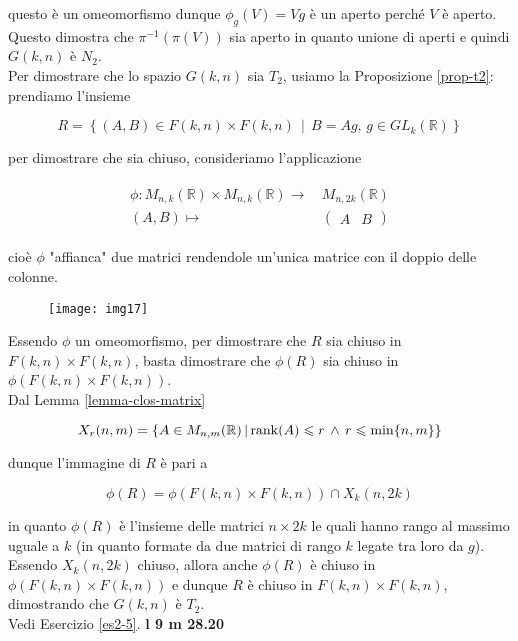questo è un omeomorfismo dunque $ \phi_{g}(V) = V g $ è un aperto perché $ V $ è aperto. Questo dimostra che $ \pi^{-1}(\pi(V)) $ sia aperto in quanto unione di aperti e quindi $ G(k,n) $ è $ N_{2} $.\\
Per dimostrare che lo spazio $ G(k,n) $ sia $ T_{2} $, usiamo la Proposizione \ref{prop-t2}: prendiamo l'insieme

\begin{equation}
	R = \left\{ (A,B) \in F(k,n) \times F(k,n) \, \middle| \, B = A g, \, g \in GL_{k}(\mathbb{R}) \right\}
\end{equation}

per dimostrare che sia chiuso, consideriamo l'applicazione

\begin{align}
	\begin{split}
		\phi : M_{n,k}(\mathbb{R}) \times M_{n,k}(\mathbb{R}) \to& \, M_{n,2k}(\mathbb{R})\\
		(A,B) \mapsto& \, \begin{pmatrix} A & B \end{pmatrix}
	\end{split}
\end{align}

cioè $ \phi $ "affianca" due matrici rendendole un'unica matrice con il doppio delle colonne.

\begin{figure}[H]
	\centering
	\texttt{[image: img17]}
\end{figure}

Essendo $ \phi $ un omeomorfismo, per dimostrare che $ R $ sia chiuso in $ F(k,n) \times F(k,n) $, basta dimostrare che $ \phi(R) $ sia chiuso in $ \phi(F(k,n) \times F(k,n)) $.\\
Dal Lemma \ref{lemma-clos-matrix}

\begin{equation}
	X_{r}(n,m) = \left\{ A \in M_{n,m}(\mathbb{R}) \, \middle| \, \rank(A) \leqslant r \, \wedge \, r \leqslant \min\{n,m\} \right\}
\end{equation}

dunque l'immagine di $ R $ è pari a

\begin{equation}
	\phi(R) = \phi(F(k,n) \times F(k,n)) \cap X_{k}(n,2k)
\end{equation}

in quanto $ \phi(R) $ è l'insieme delle matrici $ n \times 2k $ le quali hanno rango al massimo uguale a $ k $ (in quanto formate da due matrici di rango $ k $ legate tra loro da $ g $). Essendo $ X_{k}(n,2k) $ chiuso, allora anche $ \phi(R) $ è chiuso in $ \phi(F(k,n) \times F(k,n)) $ e dunque $ R $ è chiuso in $ F(k,n) \times F(k,n) $, dimostrando che $ G(k,n) $ è $ T_{2} $.\\
Vedi Esercizio \ref{es2-5}. \textbf{l 9 m 28.20}

